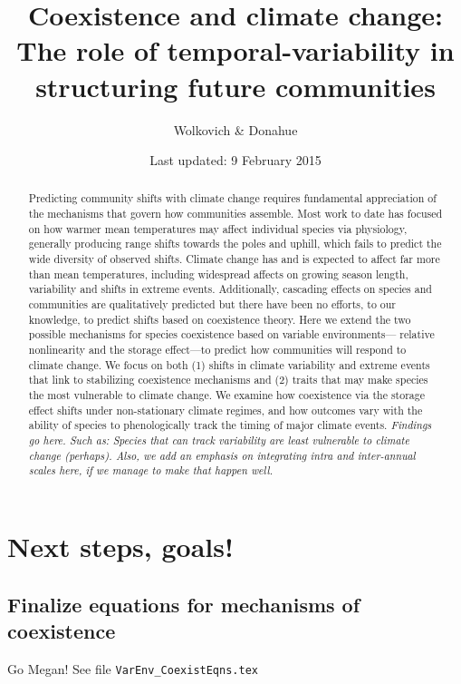 \documentclass[11pt,a4paper,oneside]{article}
\begin{document}
\renewcommand{\labelitemi}{$-$}
\title{Coexistence and climate change: \\The role of
    temporal-variability in structuring future communities}
    \author{Wolkovich \& Donahue}
\date{Last updated: 9 February 2015}
\maketitle

\begin{abstract} Predicting community shifts
with climate change requires fundamental appreciation of the
mechanisms that govern how communities assemble. Most work to date has
focused on how warmer mean temperatures may affect individual species
via physiology, generally producing range shifts towards the poles and
uphill, which fails to predict the wide diversity of observed shifts.
Climate change has and is expected to affect far more than mean
temperatures, including widespread affects on growing season
length, variability and shifts in extreme events. Additionally,
cascading effects on species and communities are qualitatively
predicted but there have been no efforts, to our knowledge, to predict
shifts based on coexistence theory. Here we extend the two possible
mechanisms for species coexistence based on variable environments---
relative nonlinearity and the storage effect---to predict how
communities will respond to climate change. We focus on both (1) shifts in
climate variability and extreme events that link to
stabilizing coexistence mechanisms and (2) traits that may
make species the most vulnerable to climate change. We examine how
coexistence via the storage effect shifts under non-stationary climate regimes, and how outcomes vary with the
ability of species to phenologically track the timing of major climate events. \emph{Findings go here. Such as: Species that can track variability are least vulnerable to climate change (perhaps).  Also, we add an emphasis on integrating intra and inter-annual scales here, if we manage to make that happen well.}
\end{abstract}

\newpage
\tableofcontents

\section{Next steps, goals!}
\subsection{Finalize equations for mechanisms of coexistence}
Go Megan! See file \verb|VarEnv_CoexistEqns.tex|
\end{document}

